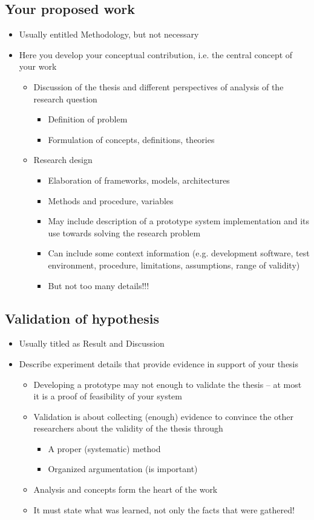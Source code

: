 \documentclass{utmthesis}
\begin{document}
\subsection{Your proposed work}
\begin{itemize}
\item Usually entitled Methodology, but not necessary
\item Here you develop your conceptual contribution, i.e. the central concept
of your work
\begin{itemize}
\item Discussion of the thesis and different perspectives of analysis of
the research question
\begin{itemize}
\item Definition of problem
\item Formulation of concepts, definitions, theories
\end{itemize}
\item Research design
\begin{itemize}
\item Elaboration of frameworks, models, architectures
\item Methods and procedure, variables
\item May include description of a prototype system implementation and its
use towards solving the research problem 
\item Can include some context information (e.g. development software, test
environment, procedure, limitations, assumptions, range of validity)
\item But not too many details!!!
\end{itemize}
\end{itemize}
\end{itemize}

\subsection{Validation of hypothesis}
\begin{itemize}
\item Usually titled as Result and Discussion
\item Describe experiment details that provide evidence in support of your
thesis
\begin{itemize}
\item Developing a prototype may not enough to validate the thesis -- at
most it is a proof of feasibility of your system
\item Validation is about collecting (enough) evidence to convince the other
researchers about the validity of the thesis through
\begin{itemize}
\item A proper (systematic) method
\item Organized argumentation (is important)
\end{itemize}
\item Analysis and concepts form the heart of the work
\item It must state what was learned, not only the facts that were gathered! 
\end{itemize}
\end{itemize}
\end{document}
